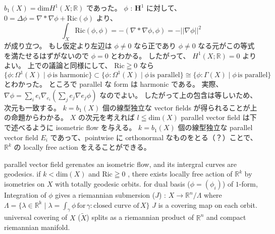 \begin{Proof}
\itemprof
  \(b_1(X) = \text{dim}H^1(X ; \mathbb{R})\) であった。
  \(\phi\) : \(\mathbf{H}^1\) に対して、 \(0 = \Delta \phi = \nabla * \nabla \phi + \text{Ric}(\phi)\) より、
  \[\int_X \text{Ric}(\phi , \phi) = - (\nabla * \nabla \phi , \phi) = - || \nabla \phi ||^2\]
  が成り立つ。
  もし仮定より左辺は \(\phi \not = 0\) なら正であり \(\phi \not = 0\) なる元がこの等式を満たせるはずがないので \(\phi = 0\) とわかる。
  したがって、 \(H^1(X;\mathbb{R}) = 0\) よりよい。
\itemprof
  上での議論と同様にして、 \(\text{Ric} \geqq 0\) なら
  \[\{\phi : \Omega^1(X) \mid \phi \, \text{is harmonic}\} \subset \{\phi : \Omega^1(X) \mid \phi \, \text{is parallel}\} \cong \{\phi : \Gamma(X) \mid \phi \, \text{is parallel}\}\]
  とわかった。
  ところで parallel な form は harmonic である。
  実際、 \(\nabla \phi = \sum_i e_i \nabla_{e_i} (\sum_j e_j \nabla e_j \phi)\) なのでよい。
  したがって上の包含は等しいため、次元も一致する。
\itemprof
  \(k = b_1(X)\) 個の線型独立な vector fields が得られることが上の命題からわかる。
  \(X\) の次元を考えれば \(l \leqq \text{dim}(X)\)
\itemprof
  parallel vector field は下で述べるように isometric flow を与える。
  \(k = b_1(X)\) 個の線型独立な parallel vector field \(E_i\) であって、pointwise に orthonormal なものをとる（？）ことで、 \(\mathbb{R}^k\) の locally free action をえることができる。
\end{Proof}

\begin{Theorem}
\itemprop
  parallel vector field gerenates an isometric flow, and its intergral curves are geodesics.
\itemprop
  if \(k < \text{dim}(X)\) and \(\text{Ric} \geqq 0\) , there exists locally free action of \(\mathbb{R}^k\) by isometries on \(X\) with totally geodesic orbits.
\itemprop
  for dual basis (\(\phi = (\phi_i)\)) of \(1\)-form, Integration of \(\phi\) gives a riemannian submersion (\(J\)) : \(X \to \mathbb{R}^n / \Lambda\) where \(\Lambda = \{\lambda \in \mathbb{R^k} \mid \lambda = \int_{\gamma} \phi \, \text{for} \, \gamma : \text{closed curve of} \, X\}\)
\itemprop
  \(J\) is a covering map on each orbit.
\itemprop
  universal covering of \(X\) (\(\tilde{X}\)) splits as a riemannian product of \(\mathbb{R}^n\) and compact riemannian manifold.
\end{Theorem}

\begin{Proof}
\itemprof
  \ADMIT
\end{Proof}

